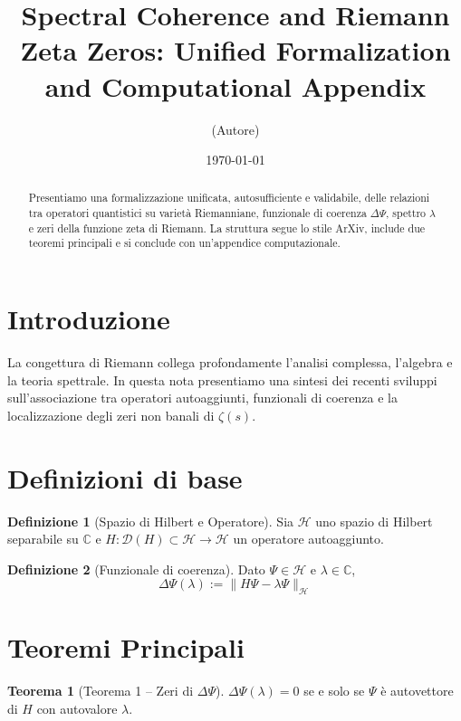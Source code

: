 \documentclass[12pt]{article}
\title{Spectral Coherence and Riemann Zeta Zeros: Unified Formalization and Computational Appendix}
\author{(Autore)}
\date{\today}
\theoremstyle{definition}
\newtheorem{definition}{Definizione}[section]
\newtheorem{theorem}{Teorema}[section]
\begin{document}
\maketitle

\begin{abstract}
Presentiamo una formalizzazione unificata, autosufficiente e validabile, delle relazioni tra operatori quantistici su varietà Riemanniane, funzionale di coerenza $\Delta\Psi$, spettro $\lambda$ e zeri della funzione zeta di Riemann. La struttura segue lo stile ArXiv, include due teoremi principali e si conclude con un’appendice computazionale.
\end{abstract}

\section{Introduzione}

La congettura di Riemann collega profondamente l’analisi complessa, l’algebra e la teoria spettrale. In questa nota presentiamo una sintesi dei recenti sviluppi sull’associazione tra operatori autoaggiunti, funzionali di coerenza e la localizzazione degli zeri non banali di $\zeta(s)$.

\section{Definizioni di base}

\begin{definition}[Spazio di Hilbert e Operatore]
Sia $\mathcal{H}$ uno spazio di Hilbert separabile su $\mathbb{C}$ e $H: \mathcal{D}(H)\subset\mathcal{H} \to \mathcal{H}$ un operatore autoaggiunto.
\end{definition}

\begin{definition}[Funzionale di coerenza]
Dato $\Psi \in \mathcal{H}$ e $\lambda \in \mathbb{C}$,
\[
\Delta\Psi(\lambda) := \| H\Psi - \lambda\Psi \|_{\mathcal{H}}
\]
\end{definition}

\section{Teoremi Principali}

\begin{theorem}[Teorema 1 – Zeri di $\Delta\Psi$]
$\Delta\Psi(\lambda) = 0$ se e solo se $\Psi$ è autovettore di $H$ con autovalore $\lambda$.
\end{theorem}
\end{document}
